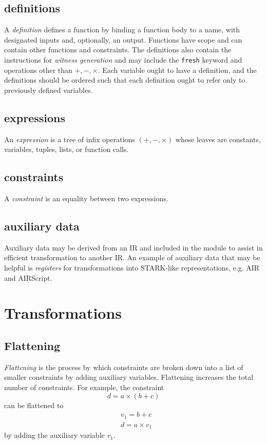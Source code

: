 \documentclass[
    9pt,            %
    techreport,        %
    affiltop,       %
]{art}
\begin{document}
\subsection{definitions}
A \emph{definition} defines a function by binding a function body to a name, with designated inputs and, optionally, an output. Functions have scope and can contain other functions and constraints. The definitions also contain the instructions for \emph{witness generation} and may include the \texttt{fresh} keyword and operations other than $+, -, \times$. Each variable ought to have a definition, and the definitions should be ordered such that each definition ought to refer only to previously defined variables.
\subsection{expressions}
An \emph{expression} is a tree of infix operations $(+, -, \times)$ whose leaves are constants, variables, tuples, lists, or function calls.

\subsection{constraints}
A \emph{constraint} is an equality between two expressions.

\subsection{auxiliary data}
Auxiliary data may be derived from an IR and included in the module to assist in efficient transformation to another IR. An example of auxiliary data that may be helpful is \emph{registers} for transformations into STARK-like representations, e.g. AIR and AIRScript.

\section{Transformations}

\subsection{Flattening}

\textit{Flattening} is the process by which constraints are broken down into a list of smaller constraints by adding auxiliary variables. Flattening increases the total number of constraints. For example, the constraint $$d = a\times(b+c)$$ can be flattened to 
\begin{multline*}
    & v_1 = b + c \\
    & d = a\times v_1
\end{multline*}
by adding the auxiliary variable $v_1$.
\end{document}
